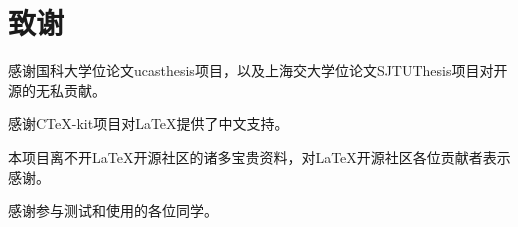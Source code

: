 \chapter[致谢]{致\quad{}谢}

感谢国科大学位论文ucasthesis项目，以及上海交大学位论文SJTUThesis项目对开源的无私贡献。

感谢CTeX-kit项目对\LaTeX{}提供了中文支持。

本项目离不开\LaTeX{}开源社区的诸多宝贵资料，对\LaTeX{}开源社区各位贡献者表示感谢。

感谢参与测试和使用的各位同学。